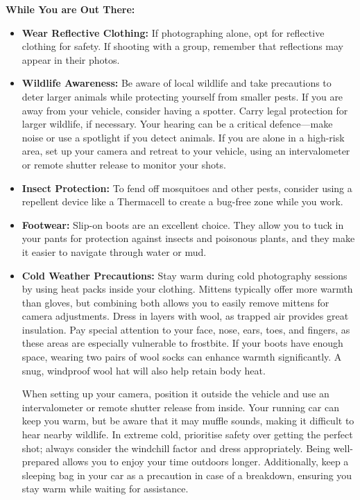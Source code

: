 \documentclass{article}
\begin{document}
\noindent\newline\textbf{While You are Out There:}    
\begin{itemize}
    \item \textbf{Wear Reflective Clothing:} If photographing alone, opt for reflective clothing for safety. If shooting with a group, remember that reflections may appear in their photos.
    \item \textbf{Wildlife Awareness:} Be aware of local wildlife and take precautions to deter larger animals while protecting yourself from smaller pests. If you are away from your vehicle, consider having a spotter. Carry legal protection for larger wildlife, if necessary. Your hearing can be a critical defence—make noise or use a spotlight if you detect animals. If you are alone in a high-risk area, set up your camera and retreat to your vehicle, using an intervalometer or remote shutter release to monitor your shots.
    \item \textbf{Insect Protection:} To fend off mosquitoes and other pests, consider using a repellent device like a Thermacell to create a bug-free zone while you work.
    \item \textbf{Footwear:} Slip-on boots are an excellent choice. They allow you to tuck in your pants for protection against insects and poisonous plants, and they make it easier to navigate through water or mud.
    \item \textbf{Cold Weather Precautions:} Stay warm during cold photography sessions by using heat packs inside your clothing. Mittens typically offer more warmth than gloves, but combining both allows you to easily remove mittens for camera adjustments. Dress in layers with wool, as trapped air provides great insulation. Pay special attention to your face, nose, ears, toes, and fingers, as these areas are especially vulnerable to frostbite. If your boots have enough space, wearing two pairs of wool socks can enhance warmth significantly. A snug, windproof wool hat will also help retain body heat.
    
    When setting up your camera, position it outside the vehicle and use an intervalometer or remote shutter release from inside. Your running car can keep you warm, but be aware that it may muffle sounds, making it difficult to hear nearby wildlife. In extreme cold, prioritise safety over getting the perfect shot; always consider the windchill factor and dress appropriately. Being well-prepared allows you to enjoy your time outdoors longer. Additionally, keep a sleeping bag in your car as a precaution in case of a breakdown, ensuring you stay warm while waiting for assistance.
\end{itemize}
\end{document}
